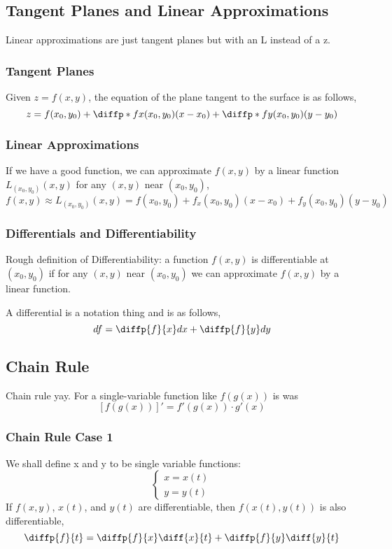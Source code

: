\documentclass{article}
\begin{document}
\subsection{Tangent Planes and Linear Approximations}
Linear approximations are just tangent planes but with an L instead of a z. 

\subsubsection{Tangent Planes}
Given $z = f(x,y)$, the equation of the plane tangent to the surface is as follows,
$$z = f(x_0,y_0) + \diffp*{f}{x}{(x_0,y_0)}(x-x_0) + \diffp*{f}{y}{(x_0,y_0)}(y-y_0)$$

\subsubsection{Linear Approximations}
If we have a good function, we can approximate $f(x,y)$ by a linear function $L_{(x_0,y_0)}(x,y)$ for any $(x,y)$ near $(x_0,y_0)$,
$$f(x,y)\approx L_{(x_0,y_0)}(x,y) = f(x_0,y_0) + f_x(x_0,y_0)(x-x_0) + f_y(x_0,y_0)(y-y_0)$$

\subsubsection{Differentials and Differentiability}
Rough definition of Differentiability: a function $f(x,y)$ is differentiable at $(x_0,y_0)$ if for any $(x,y)$ near $(x_0,y_0)$ we can approximate $f(x,y)$ by a linear function.

A differential is a notation thing and is as follows,
$$df = \diffp{f}{x}dx + \diffp{f}{y}dy$$

\subsection{Chain Rule}
Chain rule yay. For a single-variable function like $f(g(x))$ is was
$$[f(g(x))]' = f'(g(x)) \cdot g'(x)$$

\subsubsection{Chain Rule Case 1}
We shall define x and y to be single variable functions:
$$\left\{ \begin{array}{lr}
x = x(t) \\
y = y(t)
\end{array} \right.$$
If $f(x,y)$, $x(t)$, and $y(t)$ are differentiable, then $f(x(t),y(t))$ is also differentiable,
$$\diffp{f}{t} = \diffp{f}{x}\diff{x}{t} + \diffp{f}{y}\diff{y}{t}$$
\end{document}
